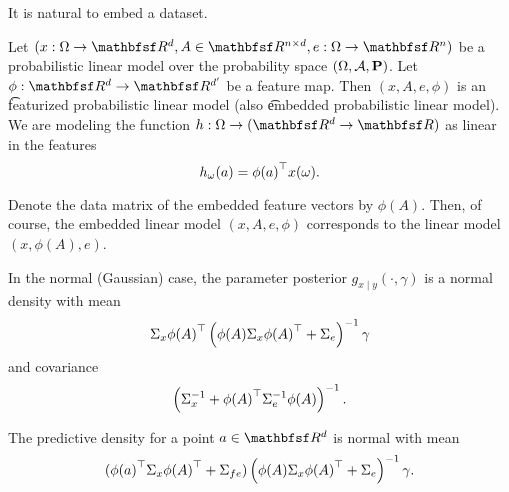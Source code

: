 

It is natural to embed a dataset.


Let $(x: \Omega \to \R^d, A \in \R^{n \times d}, e: \Omega \to \R^n)$ be a probabilistic linear model over the probability space $(\Omega, \mathcal{A}, \mathbf{P})$.
Let $\phi: \R^d \to \R^{d'}$ be a feature map.
Then $(x, A, e, \phi)$ is an \t{featurized probabilistic linear model} (also \t{embedded probabilistic linear model}).
We are modeling the function $h: \Omega \to (\R^d \to \R)$ as linear in the features
\[
  h_{\omega}(a) = {\phi(a)}^{\top}x(\omega).
\]



Denote the data matrix of the embedded feature vectors by $\phi(A)$.
Then, of course, the embedded linear model $(x, A, e, \phi)$ corresponds to the linear model $(x, \phi(A), e)$.


In the normal (Gaussian) case, the parameter posterior $g_{x \mid y}(\cdot, \gamma)$ is a normal density with mean
\[
  \Sigma_{x}{\phi(A)}^{\top}\left(\phi(A)\Sigma_{x}{\phi(A)}^{\top} + \Sigma_{e}\right)^{-1} \gamma
\]
and covariance
\[
  \left(\Sigma_{x}^{-1} + {\phi(A)}^{\top}\Sigma_{e}^{-1}\phi(A)\right)^{-1}.
\]

The predictive density for a point $a \in \R^d$ is normal with mean
\[
  ({\phi(a)}^{\top}\Sigma_{x}{\phi(A)}^{\top} + \Sigma_{fe})\left(\phi(A)\Sigma_{x}{\phi(A)}^{\top} + \Sigma_{e}\right)^{-1}\gamma.
\]

